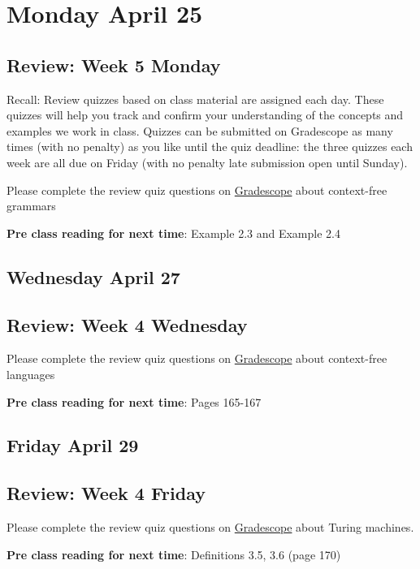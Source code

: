 

\section*{Monday April 25}


    
\newpage
\subsection*{Review: Week 5 Monday}


Recall: Review quizzes based on class material are assigned each day. 
These quizzes will help you track and confirm your understanding of the concepts and examples 
we work in class. Quizzes can be submitted on Gradescope as many times (with no penalty) as 
you like until the quiz deadline: the three quizzes each week are all due on Friday (with no penalty 
late submission open until Sunday).

Please complete the review quiz questions on \href{http://gradescope.com}{Gradescope} about 
context-free grammars

{\bf Pre class reading for next time}: Example 2.3 and Example 2.4


\newpage
\subsection*{Wednesday April 27}



\newpage
\subsection*{Review: Week 4 Wednesday}

Please complete the review quiz questions on \href{http://gradescope.com}{Gradescope} about 
context-free languages

{\bf Pre class reading for next time}: Pages 165-167



\newpage
\subsection*{Friday April 29}



\newpage
\subsection*{Review: Week 4 Friday}


Please complete the review quiz questions on \href{http://gradescope.com}{Gradescope} about 
Turing machines.


{\bf Pre class reading for next time}: Definitions 3.5, 3.6 (page 170)


